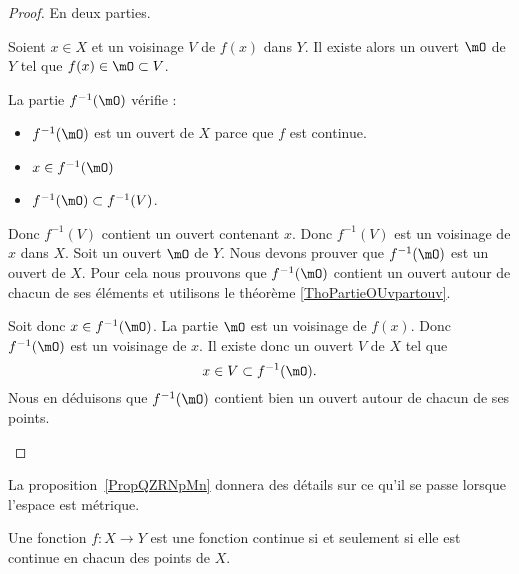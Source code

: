 \begin{proof}
	En deux parties.
	\begin{subproof}
		\spitem[\( \Rightarrow\)]
		Soient \( x\in X\) et un voisinage \( V\) de \( f(x)\) dans \( Y\). Il existe alors un ouvert \( \mO\) de \( Y\) tel que \( f(x)\in \mO\subset V\).

		La partie \( f^{-1}(\mO)\) vérifie :
		\begin{itemize}
			\item \( f^{-1}(\mO)\) est un ouvert de \( X\) parce que \( f\) est continue.
			\item \( x\in f^{-1}(\mO)\)
			\item \( f^{-1}(\mO)\subset f^{-1}(V)\).
		\end{itemize}
		Donc \( f^{-1}(V)\) contient un ouvert contenant \( x\). Donc \( f^{-1}(V)\) est un voisinage de \( x\) dans \( X\).
		\spitem[\( \Leftarrow\)]
		Soit un ouvert \( \mO\) de \( Y\). Nous devons prouver que \( f^{-1}(\mO)\) est un ouvert de \( X\). Pour cela nous prouvons que \( f^{-1}(\mO)\) contient un ouvert autour de chacun de ses éléments et utilisons le théorème \ref{ThoPartieOUvpartouv}.

		Soit donc \( x\in f^{-1}(\mO)\). La partie \( \mO\) est un voisinage de \( f(x)\). Donc \( f^{-1}(\mO)\) est un voisinage de \( x\). Il existe donc un ouvert \( V\) de \( X\) tel que
		\begin{equation}
			x\in V\subset f^{-1}(\mO).
		\end{equation}
		Nous en déduisons que \( f^{-1}(\mO)\) contient bien un ouvert autour de chacun de ses points.
	\end{subproof}
\end{proof}

La proposition~\ref{PropQZRNpMn} donnera des détails sur ce qu'il se passe lorsque l'espace est métrique.

\begin{theorem} \label{ThoESCaraB}
	Une fonction \( f\colon X\to Y\) est une fonction continue si et seulement si elle est continue en chacun des points de \( X\).
\end{theorem}

